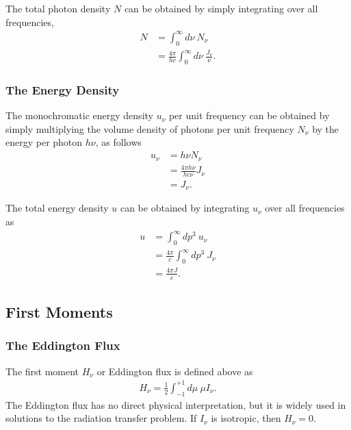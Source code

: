 The total photon density $N$ can be obtained by simply integrating over all frequencies, 
\begin{align}
N &= \int_0^\infty\!\!\!d\nu\: N_\nu\\
&= \frac{4\pi}{hc} \int_0^\infty\!\!\!d\nu\: \frac{J_\nu}{\nu}.
\end{align}

\newslide

\subsubsection{The Energy Density}

The monochromatic energy density $u_\nu$ per unit frequency can be obtained by simply multiplying the volume density of photons per unit frequency $N_\nu$ by the energy per photon $h\nu$, as follows
\begin{align}
u_\nu &= h\nu N_\nu\\
&= \frac{4\pi h\nu}{hc\nu} J_\nu\\
&= J_\nu.
\end{align}

The total energy density $u$ can be obtained by
  integrating $u_\nu$ over all frequencies as
\begin{align}
u &= \int_0^\infty\!\!\!dp^3\:u_\nu\\
&= \frac{4\pi}{c}  \int_0^\infty\!\!\!dp^3\: J_\nu\\
&= \frac{4\pi J}{c}.
\end{align}

\newslide

\subsection{First Moments}

\newslide

\subsubsection{The Eddington Flux}

The first moment $H_\nu$ or Eddington flux is defined above as
\begin{align}
H_\nu = \frac{1}{2} \int_{-1}^{+1}\!\!\!d\mu\:\mu I_\nu.
\end{align}
The Eddington flux has no direct physical interpretation, but it is
widely used in solutions to the radiation transfer problem. If $I_\nu$
is isotropic, then $H_\nu = 0$.

\newslide

